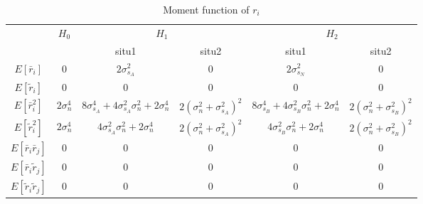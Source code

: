 \begin{table}[h]
  \begin{tabular}{|c|c|c|c|c|c|}
	\hline
	\multirow{2}{*}{}           & \multirow{2}{*}{$H_0$} & \multicolumn{2}{c|}{$H_1$}                                                               & \multicolumn{2}{c|}{$H_2$}                                                               \\ \cline{3-6} 
	&                        & situ1                                                   & situ2                          & situ1                                                   & situ2                          \\ \hline
	$E[\bar{r}_i]$              & $0$                    & $2\sigma_{s_A}^2$                                       & $0$                            & $2\sigma_{s_N}^2$                                                         & $0$                            \\ \hline
	$E[\tilde{r}_i]$            & $0$                    & $0$                                                     & $0$                            & $0$                                                     & $0$                            \\ \hline
	$E[\bar{r}_i^2]$            & $2\sigma_n^4$          & $8\sigma_{s_A}^4+4\sigma_{s_A}^2\sigma_n^2+2\sigma_n^4$ & $2(\sigma_n^2+\sigma_{s_A}^2)^2$ & $8\sigma_{s_B}^4+4\sigma_{s_B}^2\sigma_n^2+2\sigma_n^4$ & $2(\sigma_n^2+\sigma_{s_B}^2)^2$ \\ \hline
	$E[\tilde{r}_i^2]$          & $2\sigma_n^4$          & $4\sigma_{s_A}^2\sigma_n^2+2\sigma_n^4$                 & $2(\sigma_n^2+\sigma_{s_A}^2)^2$ & $4\sigma_{s_B}^2\sigma_n^2+2\sigma_n^4$                 & $2(\sigma_n^2+\sigma_{s_B}^2)^2$ \\ \hline
	$E[\bar{r}_i\bar{r}_j]$     & $0$                    & $0$                                                     & $0$                            & $0$                                                     & $0$                            \\ \hline
	$E[\bar{r}_i\tilde{r}_j]$   & $0$                    & $0$                                                     & $0$                            & $0$                                                     & $0$                            \\ \hline
	$E[\tilde{r}_i\tilde{r}_j]$ & $0$                    & $0$                                                     & $0$                            & $0$                                                     & $0$                            \\ \hline
  \end{tabular}
  \caption{Moment function of $r_i$}
  \label{table1}
\end{table}


